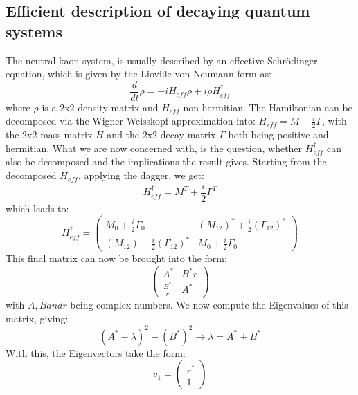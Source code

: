 \documentclass[a4paper]{article}
\begin{document}
\subsection{Efficient description of decaying quantum systems}
The neutral kaon system, is usually described by an effective Schrödinger-equation,
which is given by the Lioville von Neumann form as:
\begin{equation}
    \frac{d}{dt}\rho=-iH_{eff}\rho+i\rho H^\dagger_{eff}
\end{equation}
where $\rho$ is a 2x2 density matrix and $H_{eff}$ non hermitian. The Hamiltonian can
be decomposed via the Wigner-Weisskopf approximation into: $H_{eff}=M-\frac{i}{2}\Gamma$,
with the 2x2 mass matrix $H$ and the 2x2 decay matrix $\Gamma$ both being positive and hermitian.
What we are now concerned with, is the question, whether $H^\dagger_{eff}$
can also be decomposed and the implications the result gives.
Starting from the decomposed $H_{eff}$, applying the dagger, we get:
\begin{equation}
    H^\dagger_{eff}=M^T+\frac{i}{2}\Gamma^T
\end{equation}
which leads to:
\begin{equation}
    H^\dagger_{eff}=\left( \begin{array}{cc}
        M_0+\frac{i}{2}\Gamma_0 & (M_{12})^*+\frac{i}{2}(\Gamma_{12})^* \\
        (M_{12})+\frac{i}{2}(\Gamma_{12})^* & M_0+\frac{i}{2}\Gamma_0
    \end{array}\right)
\end{equation}
This final matrix can now be brought into the form:
\begin{equation}
    \begin{pmatrix}
        A^* & B^*r \\
        \frac{B^*}{r} & A^*
    \end{pmatrix}
\end{equation}
with $A,B and r$ being complex numbers.
\newline
We now compute the Eigenvalues of this matrix, giving:
\begin{equation}
    (A^*-\lambda)^2-(B^*)^2 \rightarrow \lambda=A^*\pm B^*
\end{equation}
With this, the Eigenvectors take the form:
\begin{equation}
    v_1=\begin{pmatrix}
        r^* \\
        1
    \end{pmatrix}
\end{equation}
\end{document}
